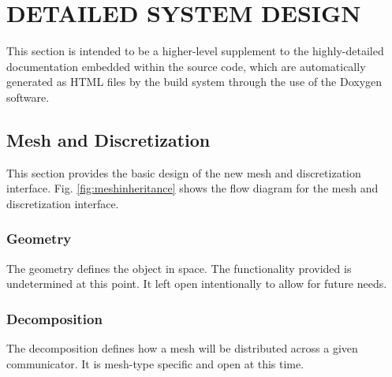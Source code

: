 \documentclass[10pt]{article}
\begin{document}

  


\vspace{0.1in}

\section{DETAILED SYSTEM DESIGN}
\label{sec:detailed}
This section is intended to be a higher-level supplement to the highly-detailed documentation embedded within the source code, which are 
automatically generated as HTML files by the build system through the use of the {Doxygen} software.

\subsection{Mesh and Discretization}
\label{sec:overview}
This section provides the basic design of the new mesh and discretization interface.  Fig. \ref{fig:meshinheritance} shows the flow diagram for the mesh and discretization interface.  




\subsubsection{Geometry}

The geometry defines the object in space.  The functionality provided is undetermined at this point.  It left open intentionally to allow for future needs. 


\subsubsection{Decomposition}

The decomposition defines how a mesh will be distributed across a given communicator.  It is mesh-type specific and open at this time.
\end{document}
